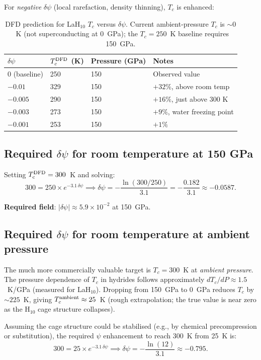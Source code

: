 \documentclass[11pt]{article}
\newcommand{\ee}[1]{\times 10^{#1}}
\newcommand{\Tc}{T_{\rm c}}
\begin{document}
For \emph{negative} $\delta\psi$ (local rarefaction, density thinning),
$T_c$ is enhanced:
\begin{table}[h]
\centering
\caption{DFD prediction for LaH$_{10}$ $T_c$ versus $\delta\psi$.
Current ambient-pressure $T_c$ is $\sim 0$~K (not superconducting at 0~GPa);
the $T_c = 250$~K baseline requires 150~GPa.}
\label{tab:LaH10}
\begin{tabular}{llll}
\toprule
$\delta\psi$ & $T_c^{\rm DFD}$ (K) & Pressure (GPa) & Notes \\
\midrule
$0$ (baseline) & 250 & 150 & Observed value \\
$-0.01$ & 329 & 150 & $+32\%$, above room temp \\
$-0.005$ & 290 & 150 & $+16\%$, just above 300 K \\
$-0.003$ & 273 & 150 & $+9\%$, water freezing point \\
$-0.001$ & 253 & 150 & $+1\%$ \\
\bottomrule
\end{tabular}
\end{table}

\subsection{Required $\delta\psi$ for room temperature at 150 GPa}

Setting $\Tc^{\rm DFD} = 300$~K and solving:
\begin{equation}
300 = 250 \times e^{-3.1\,\delta\psi}
\implies \delta\psi = -\frac{\ln(300/250)}{3.1}
= -\frac{0.182}{3.1} \approx -0.0587.
\label{eq:psi-needed}
\end{equation}

\textbf{Required field}: $|\delta\psi| \approx 5.9\ee{-2}$ at 150~GPa.

\subsection{Required $\delta\psi$ for room temperature at ambient pressure}

The much more commercially valuable target is $T_c = 300$~K at \emph{ambient
pressure}. The pressure dependence of $T_c$ in hydrides follows
approximately $dT_c/dP \approx 1.5$~K/GPa (measured for LaH$_{10}$).
Dropping from 150~GPa to 0~GPa reduces $T_c$ by $\sim 225$~K, giving
$T_c^{\rm ambient} \approx 25$~K (rough extrapolation; the true value is
near zero as the H$_{10}$ cage structure collapses).

Assuming the cage structure could be stabilised (e.g., by chemical precompression
or substitution), the required $\psi$ enhancement to reach 300~K from 25~K is:
\begin{equation}
300 = 25 \times e^{-3.1\,\delta\psi}
\implies \delta\psi = -\frac{\ln(12)}{3.1} \approx -0.795.
\label{eq:psi-ambient}
\end{equation}
\end{document}
